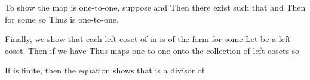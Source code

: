 \documentclass[11pt,oneside]{article}
\begin{document}
\begin{BookBody}
To show the map \BookInline{\psi } is one-to-one, suppose  and  Then there exist  such that  and  Then  for some  so  Thus \BookInline{\psi } is one-to-one.

Finally, we show that each left coset of  in  is of the form  for some  Let  be a left coset. Then if  we have  Thus \BookInline{\psi } maps  one-to-one onto the collection of left cosets so 

If  is finite, then the equation  shows that  is a divisor of \BookEnd{\blacklozenge}

\end{BookBody}

\BookNarrativetrue
\end{document}
